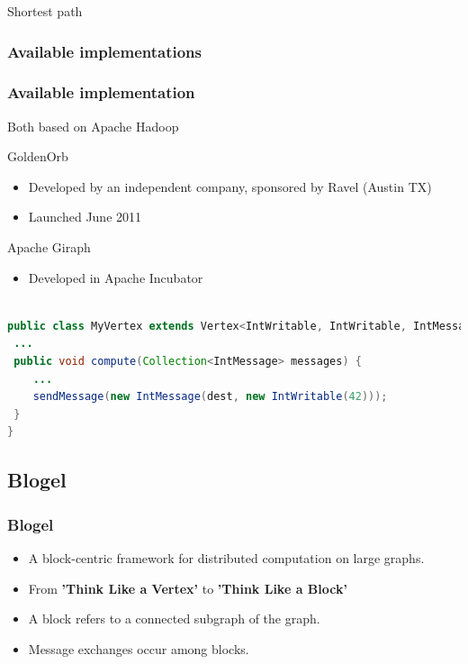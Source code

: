 \begin{frame}{Shortest path}
\begin{figure}
\begin{overprint}
\end{overprint}
\end{figure}
	
\end{frame}	



\subsubsection{Available implementations}
\begin{frame}[fragile]
 \frametitle{Available implementation}
Both based on Apache Hadoop
\begin{block}{GoldenOrb}
\begin{itemize}
 \item Developed by an independent company, sponsored by Ravel (Austin TX)
 \item Launched June 2011
\end{itemize}
\end{block}

\begin{block}{Apache Giraph}
 \begin{itemize}
 \item Developed in Apache Incubator
\end{itemize}
\end{block}

\begin{lstlisting}[language=Java,basicstyle=\tiny]

public class MyVertex extends Vertex<IntWritable, IntWritable, IntMessage>{
 ...
 public void compute(Collection<IntMessage> messages) {
    ...
    sendMessage(new IntMessage(dest, new IntWritable(42)));
 }
}
\end{lstlisting}

\end{frame}

\subsection{Blogel}
\begin{frame}
 \frametitle{Blogel}

\begin{itemize}

 \item A block-centric framework for distributed computation  on large graphs.
 \item From \textbf{'Think Like a Vertex'} to \textbf{'Think Like a Block'} 
 \item A block refers to a connected subgraph of the graph.
 \item Message exchanges occur among blocks.
 
\end{itemize}
\end{frame}


